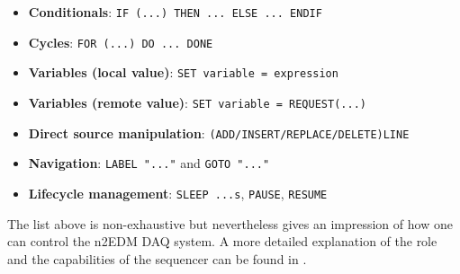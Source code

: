 \begin{itemize}
	\item \textbf{Conditionals}: \texttt{IF (...) THEN ... ELSE ... ENDIF}
	\item \textbf{Cycles}: \texttt{FOR (...) DO ... DONE}
	\item \textbf{Variables (local value)}: \texttt{SET variable = expression}
	\item \textbf{Variables (remote value)}: \texttt{SET variable = REQUEST(...)}
	\item \textbf{Direct source manipulation}: \texttt{(ADD/INSERT/REPLACE/DELETE)LINE}
	\item \textbf{Navigation}: \texttt{LABEL "..."} and \texttt{GOTO "..."}
	\item \textbf{Lifecycle management}: \texttt{SLEEP ...s}, \texttt{PAUSE}, \texttt{RESUME}
\end{itemize}

The list above is non-exhaustive but nevertheless gives an impression of how one can control the n2EDM DAQ system. A more detailed explanation of the role and the capabilities of the sequencer can be found in \cite{Germann2019}.





















